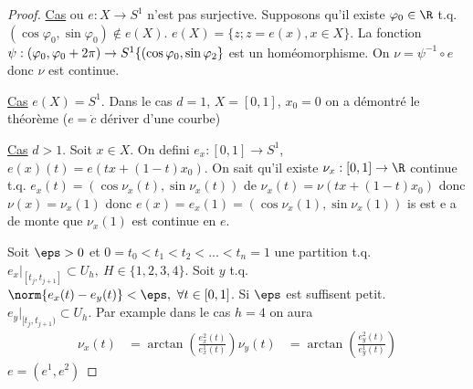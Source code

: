 		\begin{proof}
			\underline{Cas} ou $e: X\rightarrow S^1$ n'est pas surjective. Supposons qu'il existe $\varphi_0\in \R$ t.q. $(\cos\varphi_0, \sin\varphi_0)\notin e(X)$. $e(X)=\{z; z=e(x), x\in X\}$.
			La fonction $\psi:(\varphi_0, \varphi_0+2\pi)\rightarrow S^1\\\{(\cos\varphi_0, \sin\varphi_2\}$ est un homéomorphisme.
			On $\nu=\psi^{-1}\circ e$ donc $\nu$ est continue.
	
			\underline{Cas} $e(X)=S^1$. Dans le cas $d=1$, $X=[0,1]$, $x_0=0$ on a démontré le théorème ($e=\dot{c}$ dériver d'une courbe) %
	
			\underline{Cas} $d>1$. Soit $x\in X$. On defini $e_x:[0,1]\rightarrow S^1$, $e(x)(t)=e(tx+(1-t)x_0)$. %
			On sait qu'il existe $\nu_x:[0,1]\rightarrow \R$ continue t.q. $e_x(t)=(\cos\nu_x(t),\sin\nu_x(t))$ de $\nu_x(t)=\nu(tx+(1-t)x_0)$ donc $\nu(x)=\nu_x(1)$ donc
			$e(x)=e_x(1)=(\cos\nu_x(1), \sin\nu_x(1))$ is est e a de monte que $\nu_x(1)$ est continue en $e$.
	
			Soit $\eps>0$ et $0=t_0<t_1<t_2<...<t_n=1$ une partition t.q. $e_x|_{[t_j, t_{j+1}]}\subset U_h,\ H\in\{1,2,3,4\}$. Soit $y$ t.q. $\norm{e_x(t)-e_y(t)}<\eps,\ \forall t\in [0,1]$. Si $\eps$ est suffisent petit. $e_y|_{[t_j, t_{j+1})}\subset U_h$. Par example dans le cas $h=4$ on aura
			\begin{align}
				\nu_x(t) &=\arctan\left(\frac{e_x^2(t)}{e_x^1(t)}\right)
				\nu_y(t) &=\arctan\left(\frac{e_y^2(t)}{e_y^1(t)}\right)		
			\end{align}
			$e=(e^1, e^2)$
		\end{proof}

